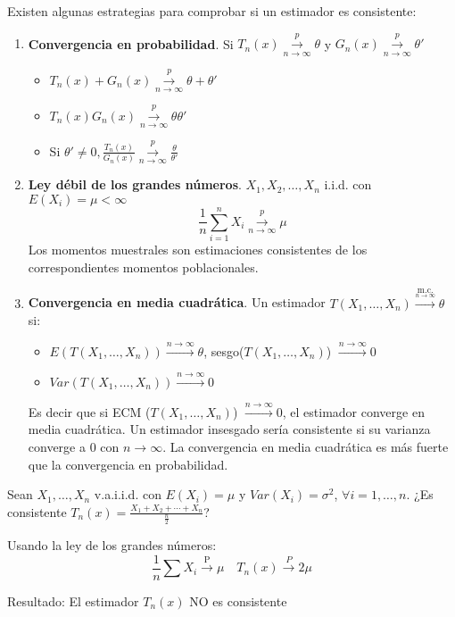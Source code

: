 Existen algunas estrategias para comprobar si un estimador es consistente:
\begin{enumerate}
    \item \textbf{Convergencia en probabilidad}. Si $T_n(x) \overset{p}{\underset{n \to \infty}{\to}} \theta$ y $G_n(x) \overset{p}{\underset{n \to \infty}{\to}} \theta'$
          \begin{itemize}
              \item $T_n(x)+G_n(x) \overset{p}{\underset{n \to \infty}{\to}} \theta + \theta '$
              \item $T_n(x)G_n(x) \overset{p}{\underset{n \to \infty}{\to}} \theta\theta '$
              \item Si $\theta' \neq 0, \frac{T_n(x)}{G_n(x)} \overset{p}{\underset{n \to \infty}{\to}} \frac{\theta}{\theta '}$
          \end{itemize}

    \item \textbf{Ley débil de los grandes números}. $X_1, X_2, \dots, X_n$ i.i.d. con $E(X_i)=\mu < \infty$
          \[\frac{1}{n}\sum_{i=1}^{n} X_i \overset{p}{\underset{n \to \infty}{\to}} \mu\]
          Los momentos muestrales son estimaciones consistentes de los correspondientes momentos poblacionales.

    \item \textbf{Convergencia en media cuadrática}. Un estimador $T(X_1, \dots, X_n)\xrightarrow{\underset{n \to \infty}{\text{m.c.}}} \theta$ si:
          \begin{itemize}
              \item $E(T(X_1, \dots, X_n)) \xrightarrow{{n \to \infty}} \theta$, sesgo($T(X_1, \dots, X_n)$) $\xrightarrow{{n \to \infty}} 0$
              \item $Var(T(X_1, \dots, X_n)) \xrightarrow{{n \to \infty}} 0$
          \end{itemize}
          Es decir que si ECM ($T(X_1, \dots, X_n)$) $\xrightarrow{{n \to \infty}} 0$, el estimador converge en media cuadrática. Un estimador insesgado sería consistente si su varianza converge a 0 con $n \to \infty$. La convergencia en media cuadrática es más fuerte que la convergencia en probabilidad.
\end{enumerate}

\begin{theorem}
    Sean $X_1, \dots, X_n$ v.a.i.i.d. con $E(X_i)=\mu$ y $Var(X_i)=\sigma^2$, $\forall i=1, \dots, n$. ¿Es consistente $T_n(x) = \frac{X_1 + X_2 + \dotsb + X_n}{\frac{n}{2}}$?

    Usando la ley de los grandes números:
    \[
        \frac{1}{n}\sum X_i \xrightarrow{\text{P}} \mu \quad T_n(x)\xrightarrow{P}2\mu
    \]

    Resultado: El estimador $T_n(x)$ NO es consistente
\end{theorem}


